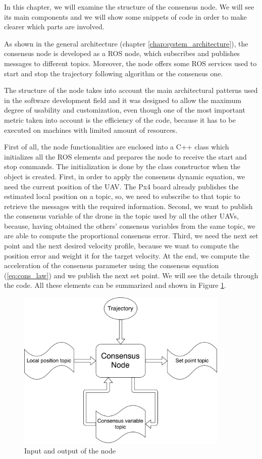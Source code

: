 In this chapter, we will examine the structure of the consensus node. We will see
its main components and we will show some snippets of code
in order to make clearer which parts are involved.

As shown in the general architecture (chapter \ref{chap:system_architecture}),
the consensus node is developed as a ROS node, which subscribes and publishes messages
to different topics.
Moreover, the node offers some ROS services used to start and stop the trajectory
following algorithm or the consensus one.

The structure of the node takes into account the main architectural patterns used
in the software development field and it was designed to allow the maximum degree
of usability and customization, even though one of the most important metric taken
into account is the efficiency of the code, because it has to be executed on
machines with limited amount of resources.

First of all, the node functionalities are enclosed into a C++ class which initializes
all the ROS elements and prepares the node to receive the start and stop commands.
The initialization is done by the class constructor when the object is created.
First, in order to apply the consensus dynamic equation, we need
the current position of the UAV. The Px4 board already publishes the estimated
local position on a topic,
so, we need to subscribe to that topic to retrieve the messages with the required
information.
Second, we want to publish the consensus variable of the drone in the topic used
by all the other UAVs, because, having obtained the others' consensus variables
from the same topic, we are able to compute the proportional consensus error.
Third, we need the next set point and the next desired velocity profile,
because we want to compute the position error and weight it for the target velocity.
At the end, we compute the acceleration of the consensus parameter using the consensus equation (\ref{eq:cons_law})
and we publish the next set point. We will see the details through the code.
All these elements can be summarized and shown in Figure \ref{fig:node_in_out}.

\begin{figure}
\centering
\includegraphics[width=0.9\textwidth]{chapters/chapter-03/figures/consensus_node_structure.pdf}
\caption{Input and output of the node}
\label{fig:node_in_out}
\end{figure}

